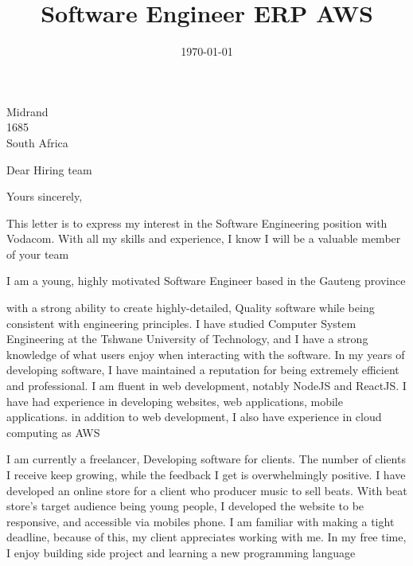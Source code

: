 \documentclass[11pt,a4paper,roman]{moderncv}        %
\title{Software Engineer ERP AWS}                               %
\begin{document}
 {Midrand \\ 1685 \\ South Africa}
\date{\today}

\makeatletter
\renewcommand*{\makeletterclosing}{
  \@closing\\%
  {\bfseries\@firstname~\@lastname}%
  \ifthenelse{\isundefined{\@enclosure}}{}{%
    \\%
    \vfil%
    {\color{color2}\itshape\enclname: \@enclosure}}%
    \vfil}
\makeatother


\opening{Dear Hiring team}

\closing{Yours sincerely,}

\makelettertitle

This letter is to express my interest in the Software Engineering position with
Vodacom. With all my skills and experience, I know I will be a valuable member
of your team

I am a young, highly motivated Software Engineer based in the Gauteng province

with a strong ability to create highly-detailed, Quality software while being
consistent with engineering principles. I have studied Computer System
Engineering at the Tshwane University of Technology, and I have a strong
knowledge of what users enjoy when interacting with the software. In my years
of developing software, I have maintained a reputation for being extremely
efficient and professional. I am fluent in web development, notably NodeJS and
ReactJS. I have had experience in developing websites, web applications, mobile
applications. in addition to web development, I also have experience in cloud
computing as AWS

I am currently a freelancer, Developing software for clients. The number of
clients I receive keep growing, while the feedback I get is overwhelmingly
positive. I have developed an online store for a client who producer music to
sell beats. With beat store's target audience being young people, I developed
the website to be responsive, and accessible via mobiles phone. I am familiar
with making a tight deadline, because of this, my client appreciates working
with me.  In my free time, I enjoy building side project and learning a new
programming language
\end{document}

